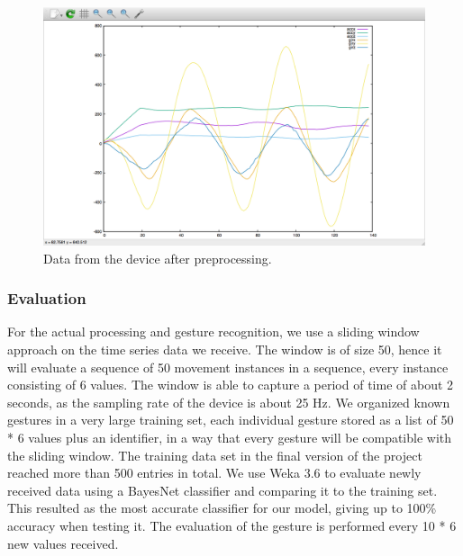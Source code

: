 \begin{figure}[h]
\centering
\includegraphics[width=1\columnwidth]{img/20}
\caption{Data from the device after preprocessing.}
\label{fig:figure3}
\end{figure}

\subsubsection{Evaluation}
For the actual processing and gesture recognition, we use a sliding window approach on the time series data we receive.
The window is of size 50, hence it will evaluate a sequence of 50 movement instances in a sequence,
every instance consisting of 6 values.
The window is able to capture a period of time of about 2 seconds, as the sampling rate of the device is about 25 Hz.
We organized known gestures in a very large training set, each individual gesture stored as a list of 50 * 6 values plus an identifier, in a way that every gesture will be compatible with the sliding window. 
The training data set in the final version of the project reached more than 500 entries in total.
We use Weka 3.6 to evaluate newly received data using a BayesNet classifier and comparing it to the training set. 
This resulted as the most accurate classifier for our model, giving up to 100\% accuracy when testing it.
The evaluation of the gesture is performed every 10 * 6 new values received.









